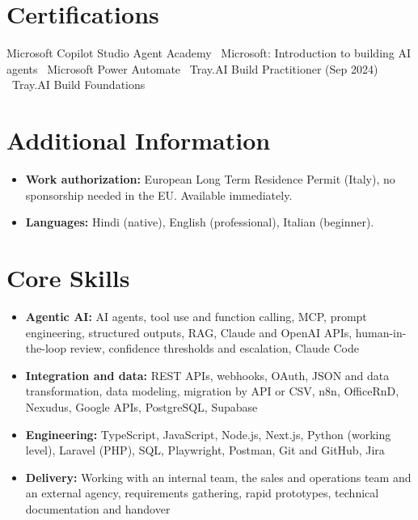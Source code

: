 \documentclass[a4paper,11pt]{article}
\begin{document}
\section{Certifications}
Microsoft Copilot Studio Agent Academy \textbullet\ Microsoft: Introduction to building AI agents \textbullet\ Microsoft Power Automate \textbullet\ Tray.AI Build Practitioner (Sep 2024) \textbullet\ Tray.AI Build Foundations

\section{Additional Information}
\begin{itemize}
 \item \textbf{Work authorization:} European Long Term Residence Permit (Italy), no sponsorship needed in the EU. Available immediately.
 \item \textbf{Languages:} Hindi (native), English (professional), Italian (beginner).
\end{itemize}

\section{Core Skills}
\begin{itemize}
 \item \textbf{Agentic AI:} AI agents, tool use and function calling, MCP, prompt engineering, structured outputs, RAG, Claude and OpenAI APIs, human-in-the-loop review, confidence thresholds and escalation, Claude Code
 \item \textbf{Integration and data:} REST APIs, webhooks, OAuth, JSON and data transformation, data modeling, migration by API or CSV, n8n, OfficeRnD, Nexudus, Google APIs, PostgreSQL, Supabase
 \item \textbf{Engineering:} TypeScript, JavaScript, Node.js, Next.js, Python (working level), Laravel (PHP), SQL, Playwright, Postman, Git and GitHub, Jira
 \item \textbf{Delivery:} Working with an internal team, the sales and operations team and an external agency, requirements gathering, rapid prototypes, technical documentation and handover
\end{itemize}
\end{document}
